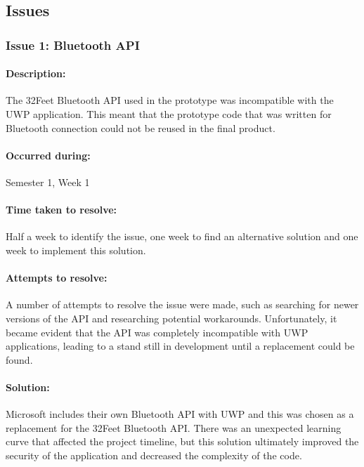 	\subsection{Issues}
		\subsubsection{Issue 1: Bluetooth API}{
			\paragraph{Description:}
			The 32Feet Bluetooth API used in the prototype was incompatible with the UWP application. This meant that the prototype code that was written for Bluetooth connection could not be reused in the final product.
				
			\paragraph{Occurred during:}
			Semester 1, Week 1
		
			\paragraph{Time taken to resolve:} Half a week to identify the issue, one week to find an alternative solution and one week to implement this solution.
		
			\paragraph{Attempts to resolve:}
			A number of attempts to resolve the issue were made, such as searching for newer versions of the API and researching potential workarounds. Unfortunately, it became evident that the API was completely incompatible with UWP applications, leading to a stand still in development until a replacement could be found.
			
			\paragraph{Solution:}
			Microsoft includes their own Bluetooth API with UWP and this was chosen as a replacement for the 32Feet Bluetooth API. There was an unexpected learning curve that affected the project timeline, but this solution ultimately improved the security of the application and decreased the complexity of the code.
		}
		\label{ssec:BluetoothAPI}
		
